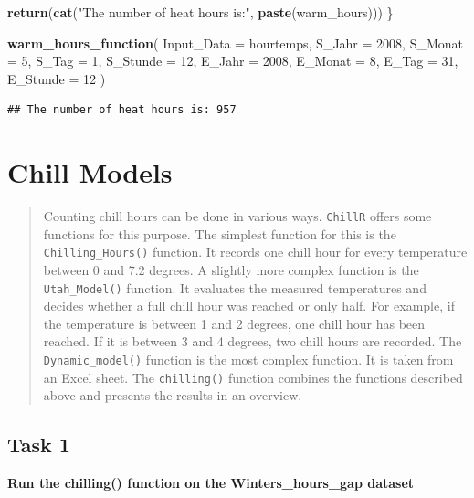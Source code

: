 \documentclass[
]{book}
\newenvironment{Shaded}{\begin{snugshade}}{\end{snugshade}}
\newcommand{\DataTypeTok}[1]{\textcolor[rgb]{0.13,0.29,0.53}{#1}}
\newcommand{\DecValTok}[1]{\textcolor[rgb]{0.00,0.00,0.81}{#1}}
\newcommand{\KeywordTok}[1]{\textcolor[rgb]{0.13,0.29,0.53}{\textbf{#1}}}
\newcommand{\NormalTok}[1]{#1}
\newcommand{\StringTok}[1]{\textcolor[rgb]{0.31,0.60,0.02}{#1}}
\begin{document}
\begin{Shaded}
\begin{Highlighting}[]
  \KeywordTok{return}\NormalTok{(}\KeywordTok{cat}\NormalTok{(}\StringTok{"The number of heat hours is:"}\NormalTok{, }\KeywordTok{paste}\NormalTok{(warm_hours)))}
\NormalTok{\}}

\KeywordTok{warm_hours_function}\NormalTok{(}
  \DataTypeTok{Input_Data =}\NormalTok{ hourtemps,}
  \DataTypeTok{S_Jahr =} \DecValTok{2008}\NormalTok{,}
  \DataTypeTok{S_Monat =} \DecValTok{5}\NormalTok{,}
  \DataTypeTok{S_Tag =} \DecValTok{1}\NormalTok{,}
  \DataTypeTok{S_Stunde =} \DecValTok{12}\NormalTok{,}
  \DataTypeTok{E_Jahr =} \DecValTok{2008}\NormalTok{,}
  \DataTypeTok{E_Monat =} \DecValTok{8}\NormalTok{,}
  \DataTypeTok{E_Tag =} \DecValTok{31}\NormalTok{,}
  \DataTypeTok{E_Stunde =} \DecValTok{12}
\NormalTok{)}
\end{Highlighting}
\end{Shaded}

\begin{verbatim}
## The number of heat hours is: 957
\end{verbatim}

\hypertarget{chill-models}{%
\chapter{Chill Models}\label{chill-models}}

\begin{quote}
Counting chill hours can be done in various ways. \texttt{ChillR} offers some functions for this purpose. The simplest function for this is the \texttt{Chilling\_Hours()} function. It records one chill hour for every temperature between 0 and 7.2 degrees.
A slightly more complex function is the \texttt{Utah\_Model()} function. It evaluates the measured temperatures and decides whether a full chill hour was reached or only half. For example, if the temperature is between 1 and 2 degrees, one chill hour has been reached. If it is between 3 and 4 degrees, two chill hours are recorded.
The \texttt{Dynamic\_model()} function is the most complex function. It is taken from an Excel sheet.
The \texttt{chilling()} function combines the functions described above and presents the results in an overview.
\end{quote}

\hypertarget{task-1-3}{%
\section{Task 1}\label{task-1-3}}

\textbf{Run the chilling() function on the Winters\_hours\_gap dataset}
\end{document}
